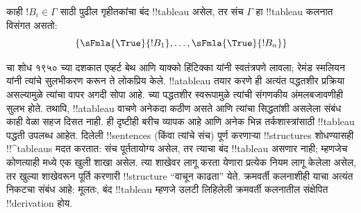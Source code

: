 \documentclass[../../../include/open-logic-section]{subfiles}
\begin{document}
काही $!B_i \in \Gamma$ साठी पुढील गृहीतकांचा बंद !!{tableau} असेल, तर
संच $\Gamma$ हा !!{tableau} कलनात विसंगत असतो:
\[
\{\sFmla{\True}{!B_1}, \dots, \sFmla{\True}{!B_n}\} 
\]

चा शोध १९५० च्या दशकात एव्हर्ट बेथ आणि याक्को हिंटिक्का यांनी
स्वतंत्रपणे लावला; रेमंड स्मलियन यांनी त्यांचे सुलभीकरण करून ते लोकप्रिय
केले. !!a{tableau} तयार करणे ही अत्यंत पद्धतशीर प्रक्रिया असल्यामुळे त्यांचा
वापर अगदी सोपा आहे. च्या पद्धतशीर स्वरूपामुळे त्यांची
संगणकीय अंमलबजावणीही सुलभ होते. तथापि, !!a{tableau} वाचणे अनेकदा कठीण
असते आणि त्यांचा सिद्धतांशी असलेला संबंध काही वेळा सहज दिसत नाही. ही
दृष्टीही बरीच व्यापक आहे आणि अनेक भिन्न तर्कशास्त्रांसाठी !!{tableau}
पद्धती उपलब्ध आहेत. दिलेली !!{sentence}s (किंवा त्यांचे संच) पूर्ण करणाऱ्या
!!{structure}s शोधण्यासही !!^{tableau}s मदत करतात: संच पूर्ततायोग्य असेल,
तर त्याचा बंद !!{tableau} असणार नाही; म्हणजेच कोणत्याही मध्ये
एक खुली शाखा असेल. त्या शाखेवर लागू करता येणारा प्रत्येक नियम लागू केलेला
असेल, तर खुल्या शाखेवरून पूर्ति करणारी !!{structure} ``वाचून काढता'' येते.
क्रमवर्ती कलनाशीही याचा अत्यंत निकटचा संबंध आहे: मूलतः, बंद !!{tableau}
म्हणजे उलटी लिहिलेली क्रमवर्ती कलनातील संक्षेपित !!{derivation} होय.
\end{document}
